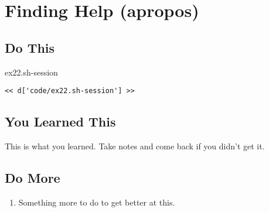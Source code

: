 \chapter{Finding Help (apropos)}

\section{Do This}

\begin{code}{ex22.sh-session}
\begin{Verbatim}
<< d['code/ex22.sh-session'] >>
\end{Verbatim}
\end{code}


\section{You Learned This}

This is what you learned.  Take notes and come back if you didn't get it.

\section{Do More}

\begin{enumerate}
\item Something more to do to get better at this.
\end{enumerate}

